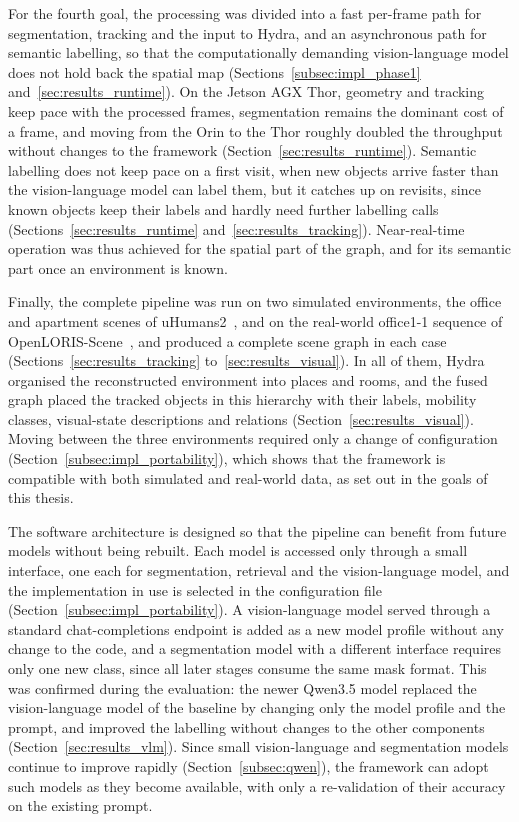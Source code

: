 {\small For the fourth goal, the processing was divided into a fast per-frame path for segmentation, tracking and the input to Hydra, and an asynchronous path for semantic labelling, so that the computationally demanding vision-language model does not hold back the spatial map (Sections~\ref{subsec:impl_phase1} and~\ref{sec:results_runtime}). On the Jetson AGX Thor, geometry and tracking keep pace with the processed frames, segmentation remains the dominant cost of a frame, and moving from the Orin to the Thor roughly doubled the throughput without changes to the framework (Section~\ref{sec:results_runtime}). Semantic labelling does not keep pace on a first visit, when new objects arrive faster than the vision-language model can label them, but it catches up on revisits, since known objects keep their labels and hardly need further labelling calls (Sections~\ref{sec:results_runtime} and~\ref{sec:results_tracking}). Near-real-time operation was thus achieved for the spatial part of the graph, and for its semantic part once an environment is known.\par}

{\small Finally, the complete pipeline was run on two simulated environments, the office and apartment scenes of uHumans2~\cite{rosinol2021kimera}, and on the real-world office1-1 sequence of OpenLORIS-Scene~\cite{shi2020openloris}, and produced a complete scene graph in each case (Sections~\ref{sec:results_tracking} to~\ref{sec:results_visual}). In all of them, Hydra organised the reconstructed environment into places and rooms, and the fused graph placed the tracked objects in this hierarchy with their labels, mobility classes, visual-state descriptions and relations (Section~\ref{sec:results_visual}). Moving between the three environments required only a change of configuration (Section~\ref{subsec:impl_portability}), which shows that the framework is compatible with both simulated and real-world data, as set out in the goals of this thesis.\par}

{\small The software architecture is designed so that the pipeline can benefit from future models without being rebuilt. Each model is accessed only through a small interface, one each for segmentation, retrieval and the vision-language model, and the implementation in use is selected in the configuration file (Section~\ref{subsec:impl_portability}). A vision-language model served through a standard chat-completions endpoint is added as a new model profile without any change to the code, and a segmentation model with a different interface requires only one new class, since all later stages consume the same mask format. This was confirmed during the evaluation: the newer Qwen3.5 model replaced the vision-language model of the baseline by changing only the model profile and the prompt, and improved the labelling without changes to the other components (Section~\ref{sec:results_vlm}). Since small vision-language and segmentation models continue to improve rapidly (Section~\ref{subsec:qwen}), the framework can adopt such models as they become available, with only a re-validation of their accuracy on the existing prompt.\par}

